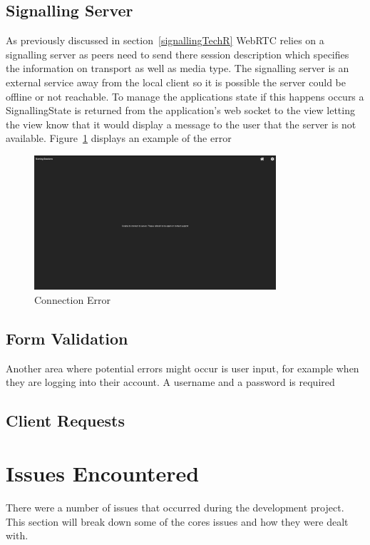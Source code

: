 \subsection{Signalling Server}
As previously discussed in section~\ref{signallingTechR} WebRTC relies on a signalling server as peers need to send there session description which specifies the information on transport as well as media type. The signalling server is an external service away from the local client so it is possible the server could be offline or not reachable. To manage the applications state if this happens occurs
a SignallingState is returned from the application's web socket to the view letting the view know that it would display a message to the user that the server is not available. Figure~\ref{image:connectionError} displays an example of the error


\begin{figure}[h!]
    \caption{Connection Error}
    \label{image:connectionError}
    \centering
    \includegraphics[width=0.8\textwidth]{images/screenshotsOfPages/connectionError.png}
\end{figure}
         
\subsection{Form Validation}
Another area where potential errors might occur is user input, for example when they are logging into their account. A username and a password is required 

\subsection{Client Requests}



\section{Issues Encountered}
There were a number of issues that occurred during the development project. This section will break down some of the cores issues and how they were dealt with. 

